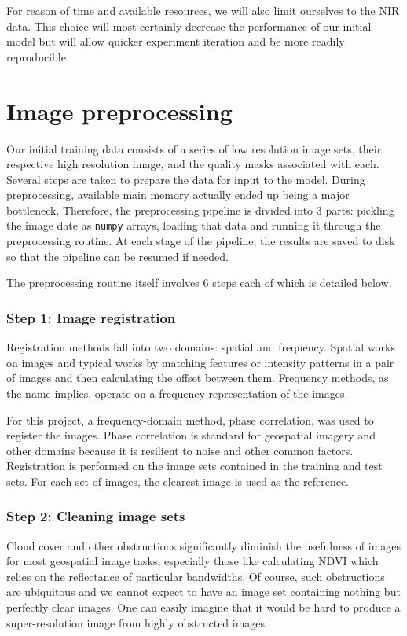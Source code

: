\documentclass{article}
\begin{document}
For reason of time and available resources, we will also limit ourselves to the NIR data. This choice will most certainly decrease the performance of our initial model but will allow quicker experiment iteration and be more readily reproducible.


\section{Image preprocessing}

Our initial training data consists of a series of low resolution image sets, their respective high resolution image, and the quality masks associated with each. Several steps are taken to prepare the data for input to the model. During preprocessing, available main memory actually ended up being a major bottleneck. Therefore, the preprocessing pipeline is divided into 3 parts: pickling the image date as \verb|numpy| arrays, loading that data and running it through the preprocessing routine. At each stage of the pipeline, the results are saved to disk so that the pipeline can be resumed if needed. 

The preprocessing routine itself involves 6 steps each of which is detailed below.

\subsubsection{Step 1: Image registration}

Registration methods fall into two domains: spatial and frequency. Spatial works on images and typical works by matching features or intensity patterns in a pair of images and then calculating the offset between them. Frequency methods, as the name implies, operate on a frequency representation of the images. 

For this project, a frequency-domain method, phase correlation, was used to register the images. Phase correlation is standard for geospatial imagery and other domains because it is resilient to noise and other common factors. Registration is performed on the image sets contained in the training and test sets. For each set of images, the clearest image is used as the reference. 

\subsubsection{Step 2: Cleaning image sets}

Cloud cover and other obstructions significantly diminish the usefulness of images for most geospatial image tasks, especially those like calculating NDVI which relies on the reflectance of particular bandwidths. Of course, such obstructions are ubiquitous and we cannot expect to have an image set containing nothing but perfectly clear images. One can easily imagine that it would be hard to produce a super-resolution image from highly obstructed images.
\end{document}
